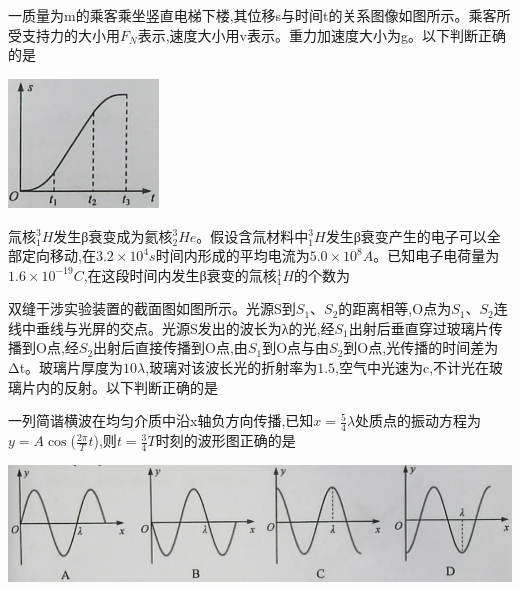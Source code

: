 \question[3]一质量为m的乘客乘坐竖直电梯下楼,其位移s与时间t的关系图像如图所示。乘客所受支持力的大小用$F_N$表示,速度大小用v表示。重力加速度大小为g。以下判断正确的是\begin{center}\includegraphics[width=4cm]{img/image1.png}\end{center}
\begin{solution}{4cm}

\end{solution}



\question[3]氚核$_1^3H$发生β衰变成为氦核$_2^3He$。假设含氚材料中$_1^3H$发生β衰变产生的电子可以全部定向移动,在$3.2×10^4s$时间内形成的平均电流为$5.0×10^8A$。已知电子电荷量为$1.6×10^{-19}C$,在这段时间内发生β衰变的氚核$_1^1H$的个数为
\begin{solution}{4cm}

\end{solution}



\question[3]双缝干涉实验装置的截面图如图所示。光源S到$S_1$、$S_2$的距离相等,O点为$S_1$、$S_2$连线中垂线与光屏的交点。光源S发出的波长为λ的光,经$S_1$出射后垂直穿过玻璃片传播到O点,经$S_2$出射后直接传播到O点,由$S_1$到O点与由$S_2$到O点,光传播的时间差为Δt。玻璃片厚度为$10λ$,玻璃对该波长光的折射率为$1.5$,空气中光速为c,不计光在玻璃片内的反射。以下判断正确的是
\begin{solution}{4cm}

\end{solution}


\newpage
\question[3]一列简谐横波在均匀介质中沿x轴负方向传播,已知$x=\frac{5}{4}\lambda$处质点的振动方程为$y=A\cos$($\frac{2\pi }{T}t$),则$t=\frac{3}{4}T$时刻的波形图正确的是\begin{center}\includegraphics[width=14cm]{img/image2.png}\end{center}
\begin{solution}{4cm}

\end{solution}



